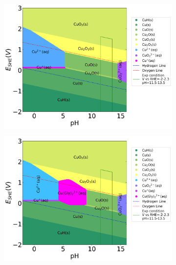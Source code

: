 \documentclass[journal=jacsat,manuscript=article]{achemso}
\begin{document}
\begin{figure}[htbp]
    \centering
    \begin{subfigure}[b]{0.3\textwidth}
        \subcaption{}\label{fig:Cu_Pourbaix_H2O}
        \includegraphics[width=\textwidth]{Figures/pourbaix_diagrams/Cu-NH3-H2O_activity=1e-04_[NH3]=0M_[Gly]=0M_[CN]=0.png}
    \end{subfigure}
    \begin{subfigure}[b]{0.3\textwidth}
        \subcaption{}\label{fig:Cu_Pourbaix_NH3_Gly}
        \includegraphics[width=\textwidth]{Figures/pourbaix_diagrams/Cu-NH3-H2O_activity=1e-04_[NH3]=0.02M_[Gly]=0.005M_[CN]=0.png}

\end{subfigure}
\end{figure}
\end{document}
